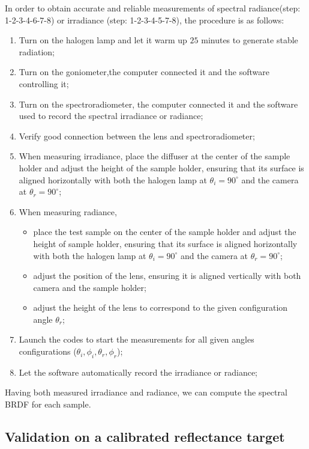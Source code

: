 In order to obtain accurate and reliable measurements of spectral radiance(step: 1-2-3-4-6-7-8) or irradiance (step: 1-2-3-4-5-7-8), the procedure is as follows:
\begin{enumerate}
    \item Turn on the halogen lamp and let it warm up $25$ minutes to generate stable radiation;
    \item Turn on the goniometer,the computer connected it and the software controlling it;
    \item Turn on the spectroradiometer, the computer connected it and the software used to record the spectral irradiance or radiance;
    \item Verify good connection between the lens and spectroradiometer;
    \item When measuring irradiance, place the diffuser at the center of the sample holder and adjust the height of the sample holder, ensuring that its surface is aligned horizontally with both the halogen lamp at $\theta_i = 90^\circ$ and the camera at $\theta_r = 90^\circ$;
    \item When measuring radiance,
          \begin{itemize}
              \item place the test sample on the center of the sample holder and adjust the height of sample holder,  ensuring that its surface is aligned horizontally with both the halogen lamp at $\theta_i = 90^\circ$ and the camera at $\theta_r = 90^\circ$;
              \item adjust the position of the lens, ensuring it is aligned vertically with both camera and the sample holder;
              \item adjust the height of the lens to correspond to the given configuration angle $\theta_r$;
          \end{itemize}
    \item Launch the codes to start the measurements for all given angles configurations ($\theta_i,\phi_i, \theta_r, \phi_r$);
    \item Let the software automatically record the irradiance or radiance;
\end{enumerate}
Having both measured irradiance and radiance, we can compute the spectral BRDF for each sample.

\subsection{Validation on a calibrated reflectance target}

